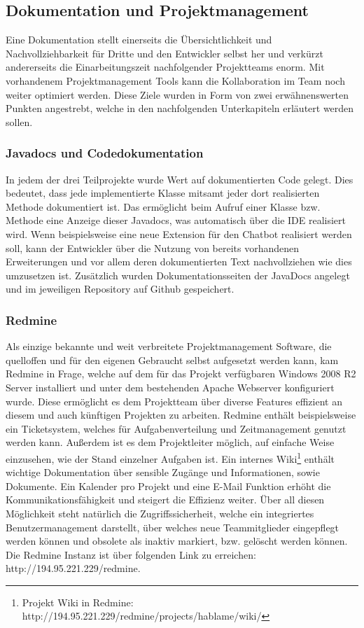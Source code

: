 \subsection{Dokumentation und Projektmanagement}
	Eine Dokumentation stellt einerseits die Übersichtlichkeit und
	Nachvollziehbarkeit für Dritte und den Entwickler selbst her und verkürzt
	andererseits die Einarbeitungszeit nachfolgender Projektteams enorm. Mit
	vorhandenem Projektmanagement Tools kann die Kollaboration im Team noch weiter
	optimiert werden. Diese Ziele wurden in Form von zwei erwähnenswerten Punkten
	angestrebt, welche in den nachfolgenden Unterkapiteln erläutert werden sollen.
	
	\subsubsection{Javadocs und Codedokumentation}
		In jedem der drei Teilprojekte wurde Wert auf dokumentierten Code gelegt. Dies
		bedeutet, dass jede implementierte Klasse mitsamt jeder dort realisierten
		Methode dokumentiert ist. Das ermöglicht beim Aufruf einer Klasse bzw. Methode
		eine Anzeige dieser Javadocs, was automatisch über die IDE realisiert wird.
		Wenn beispielsweise eine neue Extension für den Chatbot realisiert werden
		soll, kann der Entwickler über die Nutzung von bereits vorhandenen
		Erweiterungen und vor allem deren dokumentierten Text nachvollziehen wie dies
		umzusetzen ist. Zusätzlich wurden Dokumentationsseiten der JavaDocs angelegt
		und im jeweiligen Repository auf Github gespeichert.
		
	\subsubsection{Redmine}
		Als einzige bekannte und weit verbreitete Projektmanagement Software, die
		quelloffen und für den eigenen Gebraucht selbst aufgesetzt werden kann, kam
		Redmine in Frage, welche auf dem für das Projekt verfügbaren Windows 2008 R2
		Server installiert und unter dem bestehenden Apache Webserver konfiguriert
		wurde. Diese ermöglicht es dem Projektteam über diverse Features effizient
		an diesem und auch künftigen Projekten zu arbeiten. Redmine enthält
		beispielsweise ein Ticketsystem, welches für Aufgabenverteilung und
		Zeitmanagement genutzt werden kann. Außerdem ist es dem Projektleiter
		möglich, auf einfache Weise einzusehen, wie der Stand einzelner Aufgaben
		ist. Ein internes Wiki\footnote{Projekt Wiki in Redmine:
		http://194.95.221.229/redmine/projects/hablame/wiki/} enthält wichtige
		Dokumentation über sensible Zugänge und Informationen, sowie Dokumente. Ein
		Kalender pro Projekt und eine E-Mail Funktion erhöht die
		Kommunikationsfähigkeit und steigert die Effizienz weiter. Über all diesen
		Möglichkeit steht natürlich die Zugriffssicherheit, welche ein integriertes
		Benutzermanagement darstellt, über welches neue Teammitglieder eingepflegt
		werden können und obsolete als inaktiv markiert, bzw. gelöscht werden können.
		Die Redmine Instanz ist über folgenden Link zu erreichen:
		http://194.95.221.229/redmine.

